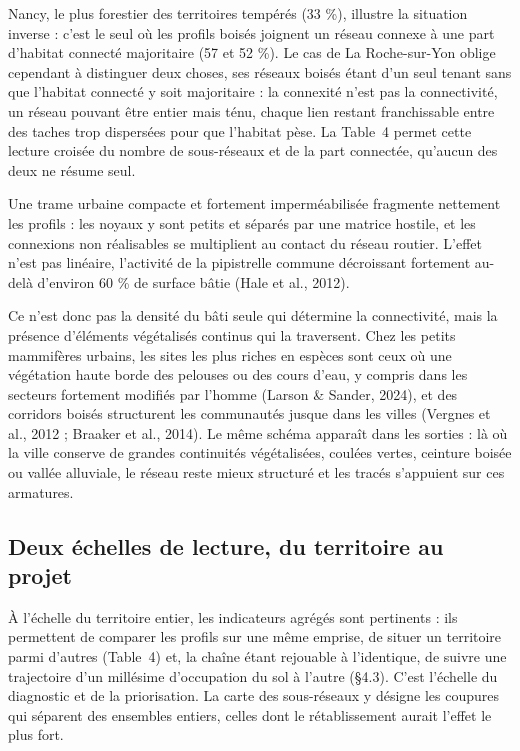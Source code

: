 \documentclass[a4paper,12pt]{report}
\begin{document}
Nancy, le plus forestier des territoires tempérés (33 \%), illustre la situation inverse : c'est le seul où les profils boisés joignent un réseau connexe à une part d'habitat connecté majoritaire (57 et 52 \%). Le cas de La Roche-sur-Yon oblige cependant à distinguer deux choses, ses réseaux boisés étant d'un seul tenant sans que l'habitat connecté y soit majoritaire : la connexité n'est pas la connectivité, un réseau pouvant être entier mais ténu, chaque lien restant franchissable entre des taches trop dispersées pour que l'habitat pèse. La Table~4 permet cette lecture croisée du nombre de sous-réseaux et de la part connectée, qu'aucun des deux ne résume seul.

Une trame urbaine compacte et fortement imperméabilisée fragmente nettement les profils : les noyaux y sont petits et séparés par une matrice hostile, et les connexions non réalisables se multiplient au contact du réseau routier. L'effet n'est pas linéaire, l'activité de la pipistrelle commune décroissant fortement au-delà d'environ 60 \% de surface bâtie (Hale et al., 2012).

Ce n'est donc pas la densité du bâti seule qui détermine la connectivité, mais la présence d'éléments végétalisés continus qui la traversent. Chez les petits mammifères urbains, les sites les plus riches en espèces sont ceux où une végétation haute borde des pelouses ou des cours d'eau, y compris dans les secteurs fortement modifiés par l'homme (Larson \& Sander, 2024), et des corridors boisés structurent les communautés jusque dans les villes (Vergnes et al., 2012 ; Braaker et al., 2014). Le même schéma apparaît dans les sorties : là où la ville conserve de grandes continuités végétalisées, coulées vertes, ceinture boisée ou vallée alluviale, le réseau reste mieux structuré et les tracés s'appuient sur ces armatures.

\subsection{Deux échelles de lecture, du territoire au projet}
À l'échelle du territoire entier, les indicateurs agrégés sont pertinents : ils permettent de comparer les profils sur une même emprise, de situer un territoire parmi d'autres (Table~4) et, la chaîne étant rejouable à l'identique, de suivre une trajectoire d'un millésime d'occupation du sol à l'autre (§4.3). C'est l'échelle du diagnostic et de la priorisation. La carte des sous-réseaux y désigne les coupures qui séparent des ensembles entiers, celles dont le rétablissement aurait l'effet le plus fort.
\end{document}
